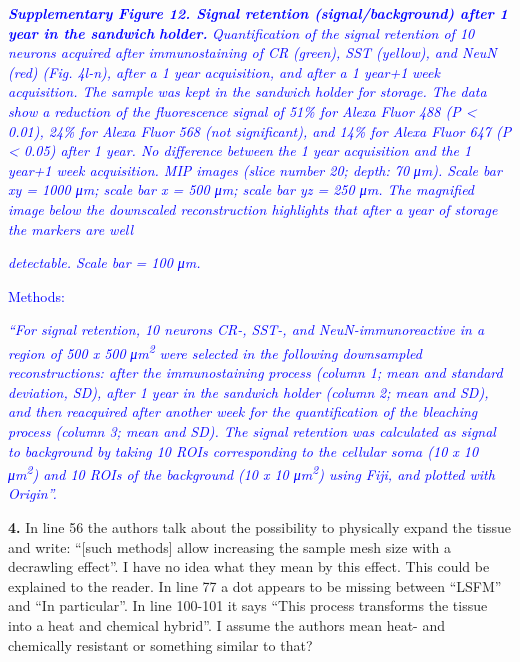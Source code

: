 \documentclass{article}
\newcommand{\reply}[1]{\textcolor{blue}{#1}}
\begin{document}
\noindent \reply{\emph{\textbf{Supplementary Figure 12. Signal retention (signal/background) after 1 year in the sandwich}}} \reply{\emph{\textbf{holder.}}} \reply{\emph{Quantification of the signal retention of 10 neurons acquired after immunostaining of CR}} \reply{\emph{(green), SST (yellow), and NeuN (red) (Fig. 4l-n), after a 1 year acquisition, and after a 1 year+1}} \reply{\emph{week acquisition. The sample was kept in the sandwich holder for storage. The data show a}} \reply{\emph{reduction of the fluorescence signal of 51\% for Alexa Fluor 488 (P < 0.01), 24\% for Alexa Fluor}} \reply{\emph{568 (not significant), and 14\% for Alexa Fluor 647 (P < 0.05) after 1 year. No difference between}} \reply{\emph{the 1 year acquisition and the 1 year+1 week acquisition. MIP images (slice number 20; depth: 70}} \reply{\emph{μm). Scale bar xy = 1000 μm; scale bar x = 500 μm; scale bar yz = 250 μm. The magnified image}} \reply{\emph{below the downscaled reconstruction highlights that after a year of storage the markers are well}}

\noindent {}\reply{\emph{detectable. Scale bar = 100 μm.}}

\noindent \reply{Methods:}

\noindent \reply{\emph{“For signal retention, 10 neurons CR-, SST-, and NeuN-immunoreactive in a region of 500 x 500}} \reply{\emph{μm}}\reply{\emph{\textsuperscript{2}}} \reply{\emph{were selected in the following downsampled reconstructions: after the immunostaining}} \reply{\emph{process (column 1; mean and standard deviation, SD), after 1 year in the sandwich holder (column}} \reply{\emph{2; mean and SD), and then reacquired after another week for the quantification of the bleaching}} \reply{\emph{process (column 3; mean and SD). The signal retention was calculated as signal to background by}} \reply{\emph{taking 10 ROIs corresponding to the cellular soma (10 x 10 μm}}\reply{\emph{\textsuperscript{2}}}\reply{\emph{) and 10 ROIs of the background}} \reply{\emph{(10 x 10 μm}}\reply{\emph{\textsuperscript{2}}}\reply{\emph{) using Fiji, and plotted with Origin”.}}

\noindent \textbf{4.} In line 56 the authors talk about the possibility to physically expand the tissue and write: “[such methods] allow increasing the sample mesh size with a decrawling effect”. I have no idea what they mean by this effect. This could be explained to the reader. In line 77 a dot appears to be missing between “LSFM” and “In particular”. In line 100-101 it says “This process transforms the tissue into a heat and chemical hybrid”. I assume the authors mean heat- and chemically resistant or something similar to that?
\end{document}
